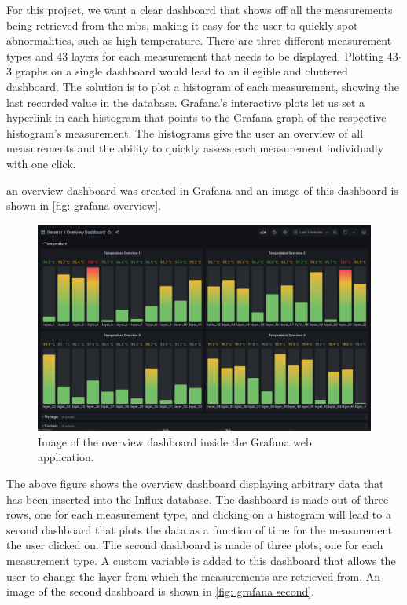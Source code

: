 \documentclass[main.tex]{subfiles}
\begin{document}
For this project, we want a clear dashboard that shows off all the measurements being retrieved from the \gls{mb}s, making it easy for the user to quickly spot abnormalities, such as high temperature. There are three different measurement types and 43 layers for each measurement that needs to be displayed. Plotting 43$\cdot$3 graphs on a single dashboard would lead to an illegible and cluttered dashboard. The solution is to plot a histogram of each measurement, showing the last recorded value in the database. Grafana's interactive plots let us set a hyperlink in each histogram that points to the Grafana graph of the respective histogram's measurement. The histograms give the user an overview of all measurements and the ability to quickly assess each measurement individually with one click.

an overview dashboard was created in Grafana and an image of this dashboard is shown in \autoref{fig: grafana overview}.

\begin{figure}[!htpb]
    \centering
    \includegraphics[width=16cm, scale=4]{images/grafana_overview.png}
    \caption{Image of the overview dashboard inside the Grafana web application.}
    \label{fig: grafana overview}
\end{figure}
\FloatBarrier

The above figure shows the overview dashboard displaying arbitrary data that has been inserted into the Influx database. The dashboard is made out of three rows, one for each measurement type, and clicking on a histogram will lead to a second dashboard that plots the data as a function of time for the measurement the user clicked on. The second dashboard is made of three plots, one for each measurement type. A custom variable is added to this dashboard that allows the user to change the layer from which the measurements are retrieved from. An image of the second dashboard is shown in \autoref{fig: grafana second}.
\end{document}
